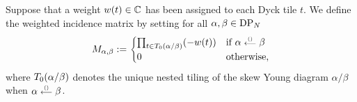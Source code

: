 \documentclass[oneside,english]{amsart}
\numberwithin{equation}{section}
\numberwithin{figure}{section}
\theoremstyle{plain}
\theoremstyle{plain}
\theoremstyle{plain}
\theoremstyle{remark}
\theoremstyle{plain}
\theoremstyle{plain}
\theoremstyle{plain}
\theoremstyle{plain}
\theoremstyle{plain}
\theoremstyle{plain}
\theoremstyle{plain}
\theoremstyle{plain}
\begin{document}
Suppose that a weight $w(t) \in \mathbb{C}$ has been %
assigned
to each %
Dyck tile $t$.
We define the weighted incidence matrix by setting
for all $\alpha, \beta \in \mathrm{DP}_N$
\begin{align} \label{eq: def of weighted incidence matrix}
M_{\alpha, \beta} := \begin{cases}
\prod_{t \in T_0 (\alpha / \beta)} (-w(t)) & \text{if }\alpha \stackrel{\scriptscriptstyle{()}}{\scriptstyle{\longleftarrow}} \beta\\
0 & \text{otherwise}, 
\end{cases} 
\end{align}
where $T_0 (\alpha / \beta)$ denotes the unique nested tiling of the skew Young diagram $\alpha / \beta$ when $\alpha \stackrel{\scriptscriptstyle{()}}{\scriptstyle{\longleftarrow}} \beta$.

\end{document}
